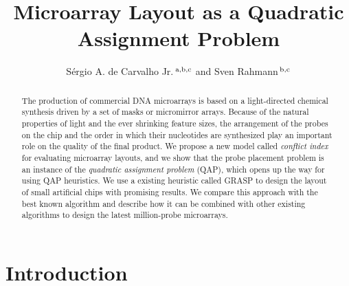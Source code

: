 \documentclass[english]{lni}
\begin{document}
\author{S\'ergio A. de Carvalho Jr.\,$^{\rm a,b,c}$ and Sven Rahmann\,$^{\rm b,c}$}
\title{Microarray Layout as a Quadratic Assignment Problem}


\maketitle

\begin{abstract}

The production of commercial DNA microarrays is based on a
light-directed chemical synthesis driven by a set of masks or
micromirror arrays. Because of the natural properties of light and the
ever shrinking feature sizes, the arrangement of the probes on the
chip and the order in which their nucleotides are synthesized play an
important role on the quality of the final product.
We propose a new model called \emph{conflict index} for evaluating
microarray layouts, and we show that the probe placement problem is an
instance of the \emph{quadratic assignment problem} (QAP), which opens
up the way for using QAP heuristics. We use a existing heuristic
called GRASP to design the layout of small artificial chips with
promising results. We compare this approach with the best known
algorithm and describe how it can be combined with other existing
algorithms to design the latest million-probe microarrays.

\end{abstract}

\section{Introduction}
\end{document}
